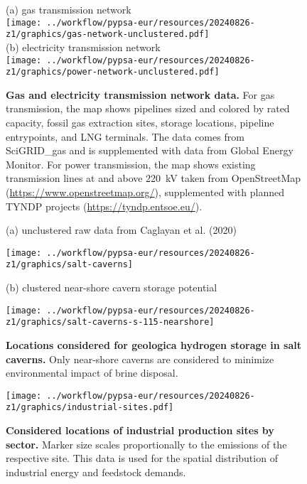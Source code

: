 \begin{figure*}
    \centering
    \footnotesize
    (a) gas transmission network \\
    \texttt{[image: ../workflow/pypsa-eur/resources/20240826-z1/graphics/gas-network-unclustered.pdf]} \\
    (b) electricity transmission network \\
    \texttt{[image: ../workflow/pypsa-eur/resources/20240826-z1/graphics/power-network-unclustered.pdf]}
    \caption{\textbf{Gas and electricity transmission network data.} For gas
    transmission, the map shows pipelines sized and colored by rated capacity,
    fossil gas extraction sites, storage locations, pipeline entrypoints, and
    LNG terminals. The data comes from SciGRID\_gas and is supplemented with
    data from Global Energy Monitor. For power transmission, the map shows
    existing transmission lines at and above 220~kV taken from OpenStreetMap (\url{https://www.openstreetmap.org/}),
    supplemented with planned TYNDP projects (\url{https://tyndp.entsoe.eu/}).}
    \label{fig:si:networks-raw}
\end{figure*}

\begin{figure*}
    \footnotesize
    (a) unclustered raw data from Caglayan et al. (2020) \\
    \begin{center}
        \texttt{[image: ../workflow/pypsa-eur/resources/20240826-z1/graphics/salt-caverns]}\\
    \end{center}
    (b) clustered near-shore cavern storage potential \\
    \begin{center}
        \texttt{[image: ../workflow/pypsa-eur/resources/20240826-z1/graphics/salt-caverns-s-115-nearshore]}
    \end{center}
    \caption{\textbf{Locations considered for geologica hydrogen storage in salt
    caverns.} Only near-shore caverns are considered to minimize environmental
    impact of brine disposal.}
    \label{fig:si:hydrogen-caverns}
\end{figure*}


\begin{figure*}
    \centering
    \texttt{[image: ../workflow/pypsa-eur/resources/20240826-z1/graphics/industrial-sites.pdf]}
    \caption{\textbf{Considered locations of industrial production sites by
    sector.} Marker size scales proportionally to the emissions of the
    respective site. This data is used for the spatial distribution of
    industrial energy and feedstock demands.}
    \label{fig:si:industrial-sites}
\end{figure*}
